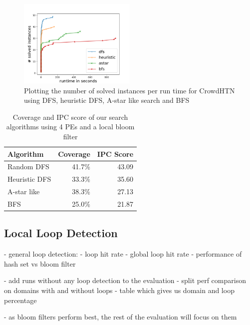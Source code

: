 \begin{figure}
	\caption{Plotting the number of solved instances per run time for CrowdHTN using DFS, heuristic DFS, A-star like search and BFS}
	\label{figure: eval algorithm}
	\centering
	\includegraphics[width=0.5\textwidth]{images/final/search_algorithms.png}
\end{figure}
\begin{table}
	\caption{Coverage and IPC score of our search algorithms using 4 PEs and a local bloom filter}
	\label{table: eval algorithm}
	\centering
	\begin{tabular}{| l | r | r |}
		\hline
		Algorithm 		& Coverage & IPC Score \\
		\hline
		Random DFS 		& 41.7\%	& 43.09 \\ %
		Heuristic DFS 	& 33.3\%	& 35.60	\\ %
		A-star like 	& 38.3\%	& 27.13 \\ %
		BFS 			& 25.0\%	& 21.87	\\ %
		\hline
	\end{tabular}
\end{table}

\subsection{Local Loop Detection}
\label{eval: loop detection}
- general loop detection:
- loop hit rate
- global loop hit rate
- performance of hash set vs bloom filter

- add runs without any loop detection to the evaluation
- split perf comparison on domains with and without loops
- table which gives us domain and loop percentage

- as bloom filters perform best, the rest of the evaluation will focus on them

